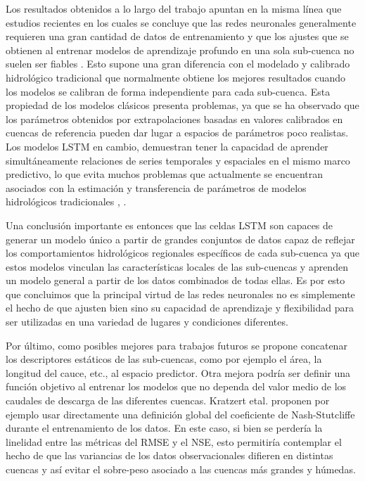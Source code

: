 Los resultados obtenidos a lo largo del trabajo apuntan en la misma línea que estudios recientes en los cuales se concluye que 
las redes neuronales generalmente requieren una gran cantidad de datos de entrenamiento y que 
los ajustes que se obtienen al entrenar modelos de aprendizaje profundo en una sola sub-cuenca no suelen ser fiables \cite{Kratzert}. 
Esto supone una gran diferencia con el modelado y calibrado hidrológico tradicional que normalmente obtiene 
los mejores resultados cuando los modelos se calibran de forma independiente para cada sub-cuenca.
Esta propiedad de los modelos clásicos presenta problemas, ya que se ha observado que los 
 parámetros obtenidos por extrapolaciones  basadas en valores calibrados en cuencas de referencia 
pueden dar lugar a espacios de parámetros poco realistas\cite{Mizukami}. 
Los modelos LSTM en cambio, demuestran tener la capacidad de aprender simultáneamente relaciones de series temporales 
y espaciales en el mismo marco predictivo, lo que evita muchos problemas que actualmente se encuentran 
asociados con la estimación y transferencia de parámetros de modelos hidrológicos tradicionales \cite{Kratzert}, \cite{nearing}.

Una conclusión importante es entonces que las celdas LSTM son capaces de generar un modelo único a partir de grandes conjuntos de datos  
capaz de reflejar los comportamientos hidrológicos regionales específicos de cada sub-cuenca
ya que estos modelos  vinculan las características locales de las sub-cuencas y aprenden
un modelo general a partir de los datos combinados de todas ellas. 
Es por esto que concluimos que la principal virtud de las redes neuronales no es simplemente el hecho de que ajusten bien sino su capacidad de
aprendizaje y  flexibilidad para ser utilizadas en una variedad de  lugares y condiciones diferentes.


Por último, como posibles mejores para trabajos futuros se propone concatenar los descriptores estáticos de las sub-cuencas, 
como por ejemplo el área, la longitud del cauce, etc., al espacio predictor. Otra mejora podría ser definir una función objetivo al 
entrenar los modelos que no dependa del valor medio de los caudales de descarga de las diferentes cuencas. Kratzert etal. \cite{Kratzert} 
proponen por ejemplo usar directamente una definición global del coeficiente de Nash-Stutcliffe durante el entrenamiento
de los datos. En este caso, si bien se perdería la linelidad entre las métricas del RMSE y el NSE,  esto permitiría 
contemplar el hecho de que las variancias de los datos observacionales difieren en distintas cuencas y así evitar el sobre-peso 
asociado a las cuencas más grandes y húmedas.
